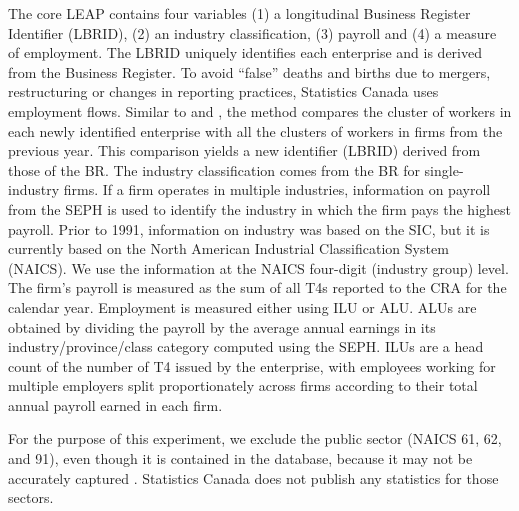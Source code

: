 The core \ac{LEAP}  contains four variables (1) a longitudinal Business Register Identifier (LBRID), (2) an industry classification, (3) payroll and (4) a measure of employment. 
%
The LBRID uniquely identifies each enterprise and is derived from the Business Register. To avoid ``false'' deaths and births due to mergers, restructuring or changes in reporting practices, Statistics Canada uses employment flows. Similar to \citet{BenedettoEtAl2007} and \citet{RePEc:iab:iabfme:201006_en}, the method  compares the cluster of workers in each newly identified enterprise with all the clusters of workers in firms from the previous year. This comparison yields a new identifier (LBRID) derived from those of the \ac{BR}.
The industry classification comes from the \ac{BR} for single-industry firms. If a firm operates in multiple industries, information on payroll from the \ac{SEPH} is used to identify the industry in which the firm pays the highest payroll. Prior to 1991, information on industry was based on the SIC,  but it is currently based on the  North American Industrial Classification System (NAICS). We use the information at the NAICS four-digit (industry group) level. 
The firm's payroll is measured as the sum of all T4s  reported to the CRA for the calendar year.
Employment is measured either using \ac{ILU} or \ac{ALU}. \acp{ALU} are obtained by dividing the payroll by the average annual earnings in its industry/province/class category computed using the \ac{SEPH}. \acp{ILU} are a head count of the number of T4 issued by the enterprise, with employees working for multiple employers split proportionately across firms according to their total annual payroll earned in each firm. 



For the purpose of this experiment,  we exclude the public sector (NAICS 61, 62, and 91), even though it is contained in the database, because it may not be accurately captured \citep{StatisticsCanada2019}. Statistics Canada does not publish any statistics for those sectors.